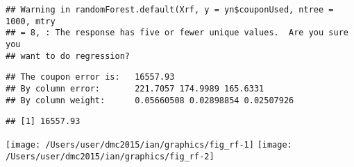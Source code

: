 \documentclass[10pt]{report}
\newenvironment{Shaded}{}{}
\newcommand{\KeywordTok}[1]{\textcolor[rgb]{0.00,0.44,0.13}{\textbf{{#1}}}}
\newcommand{\DataTypeTok}[1]{\textcolor[rgb]{0.56,0.13,0.00}{{#1}}}
\newcommand{\DecValTok}[1]{\textcolor[rgb]{0.25,0.63,0.44}{{#1}}}
\newcommand{\StringTok}[1]{\textcolor[rgb]{0.25,0.44,0.63}{{#1}}}
\newcommand{\CommentTok}[1]{\textcolor[rgb]{0.38,0.63,0.69}{\textit{{#1}}}}
\newcommand{\OtherTok}[1]{\textcolor[rgb]{0.00,0.44,0.13}{{#1}}}
\newcommand{\NormalTok}[1]{{#1}}
\begin{document}
\begin{Shaded}
\end{Shaded}

\begin{verbatim}
## Warning in randomForest.default(Xrf, y = yn$couponUsed, ntree = 1000, mtry
## = 8, : The response has five or fewer unique values.  Are you sure you
## want to do regression?
\end{verbatim}

\begin{Shaded}
\end{Shaded}

\begin{verbatim}
## The coupon error is:   16557.93 
## By column error:       221.7057 174.9989 165.6331 
## By column weight:      0.05660508 0.02898854 0.02507926
\end{verbatim}

\begin{verbatim}
## [1] 16557.93
\end{verbatim}

\begin{center}\texttt{[image: /Users/user/dmc2015/ian/graphics/fig\_rf-1]} \texttt{[image: /Users/user/dmc2015/ian/graphics/fig\_rf-2]} \end{center}
\end{document}
